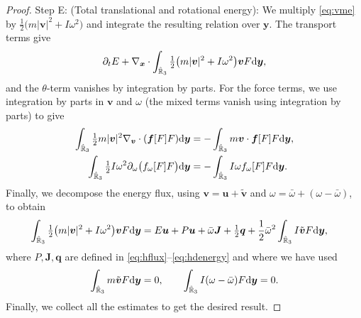 \documentclass[a4paper,11pt]{article}
\numberwithin{equation}{section}
\theoremstyle{definition}
\newcommand{\bfs}[1]{{\boldsymbol #1}}
\newcommand{\bfx}{\boldsymbol{x}}
\newcommand{\bfy}{\boldsymbol{y}}
\newcommand{\bfv}{\boldsymbol{v}}
\newcommand{\bfuu}{\boldsymbol{u}}
\newcommand{\bff}{\boldsymbol{f}}
\newcommand{\bbr}{\mathbb R}
\def\d{{  \rm d}}
\begin{document}
\begin{proof}
\noindent Step E: (Total translational and rotational energy):
We multiply \eqref{eq:vme} by $\frac12\big(m|\bfv|^2+I\omega^2\big)$ and integrate the resulting relation over $\bfy$.
The transport terms give
\[
\partial_tE + \nabla_{\bfx}\cdot\int_{\hat{\bbr}_3} \tfrac12\big(m|\bfv|^2+I\omega^2\big) \bfv F \d\bfy,
\]
and the $\theta$-term vanishes by integration by parts.
For the force terms, we use integration by parts in $\bfv$ and $\omega$ (the mixed terms vanish using integration by parts) to give
\begin{align*}
\int_{\hat{\bbr}_3} \tfrac12 m|\bfv|^2  \nabla_{\bfv}\cdot(\bff[F]F) \d\bfy
&=  -\int_{\hat{\bbr}_3} m \bfv\cdot\bff[F]F \d\bfy,\\
\int_{\hat{\bbr}_3} \tfrac12 I\omega^2  \partial_\omega\big(f_\omega[F]F\big) \d\bfy
&=  -\int_{\hat{\bbr}_3} I \omega f_\omega[F]F \d\bfy.
\end{align*}
Finally, we decompose the energy flux, using $\bfv=\bfuu+\tilde{\bfv}$ and $\omega=\bar\omega+(\omega-\bar\omega)$, to obtain
\begin{align*}
\int_{\hat{\bbr}_3} \tfrac12\big(m|\bfv|^2+I\omega^2\big) \bfv F \d\bfy
&=E \bfuu + P \bfuu + \bar\omega \bfs{J} + \tfrac12\bfs{q}+\frac{1}{2}\bar\omega^2\int_{\hat{\bbr}_3} I \tilde{\bfv} F \d\bfy,
\end{align*}
where $P,\bfs{J},\bfs{q}$ are defined in \eqref{eq:hflux}--\eqref{eq:hdenergy} and where we have used
\[
\int_{\hat{\bbr}_3} m \tilde{\bfv} F \d\bfy=0,\qquad\int_{\hat{\bbr}_3} I(\omega-\bar\omega) F \d\bfy=0.
\]
Finally, we collect all the estimates to get the desired result.
\end{proof}
\end{document}
